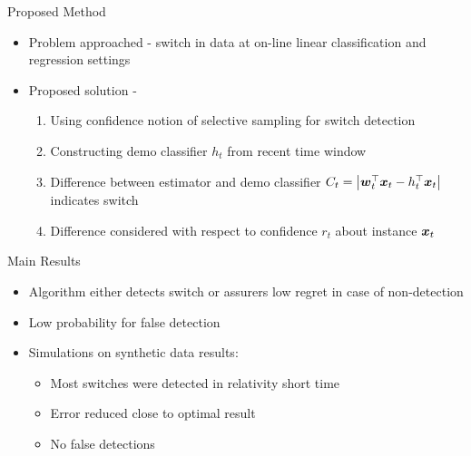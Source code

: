 \documentclass{beamer}
\begin{document}
\begin{frame}{Proposed Method}
\begin{itemize}
\item Problem approached - switch in data at on-line linear classification and regression settings\newline
\item Proposed solution -\newline
\begin{enumerate}
\item Using confidence notion of selective sampling for switch detection\newline
\item Constructing demo classifier $h_t$ from recent time window\newline
\item Difference between estimator and demo classifier $C_t=\left\vert{{\boldsymbol{w}}}^{\top}_{t}{\boldsymbol{x}}_{t}-h_{t}^{\top}{\boldsymbol{x}}_{t}\right\vert$ indicates switch\newline
\item Difference considered with respect to confidence $r_t$ about instance ${\boldsymbol{x}}_{t}$
\end{enumerate}
\end{itemize}
\end{frame}


\begin{frame}{Main Results}
\begin{itemize}
\item Algorithm either detects switch or assurers low regret in case of non-detection\newline
\item Low probability for false detection\newline
\item Simulations on synthetic data results:\newline

\begin{itemize}
\item Most switches were detected in relativity short time\newline
\item Error reduced close to optimal result\newline
\item No false detections
\end{itemize}
\end{itemize}
\end{frame}
\end{document}
